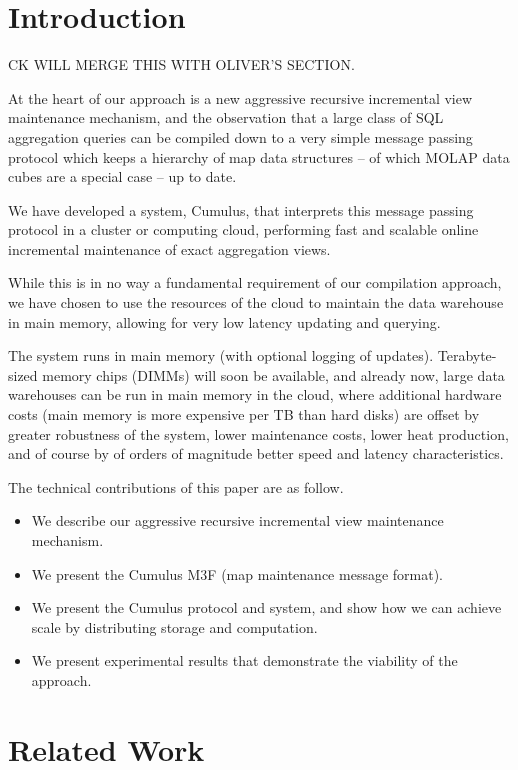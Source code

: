 
\section{Introduction}


CK WILL MERGE THIS WITH OLIVER'S SECTION.

At the heart of our approach is a new aggressive recursive incremental
view maintenance mechanism, and the observation that a large class of
SQL aggregation queries can be compiled down to a very simple message
passing protocol which keeps a hierarchy of map data structures -- of
which MOLAP data cubes are a special case -- up to date.

We have developed a system, Cumulus, that interprets this message passing
protocol in a cluster or computing cloud, performing fast and scalable
online incremental maintenance of exact aggregation views. 

While this is in no way a fundamental requirement of our compilation
approach, we have chosen to use the resources of the cloud to maintain
the data warehouse in main memory, allowing for very low latency
updating and querying.

The system runs in main memory (with optional logging of updates).
Terabyte-sized memory chips (DIMMs) will soon be available, and already now,
large data warehouses
can be run in main memory in the cloud, where additional hardware costs
(main memory is more expensive per TB than hard disks) are
offset by greater robustness of the system, lower maintenance
costs, lower heat production, and of course by of orders of magnitude
better speed and latency characteristics.


The technical contributions of this paper are as follow.
\begin{itemize}
\item
We describe our aggressive recursive incremental view maintenance mechanism.

\item
We present the Cumulus M3F (map maintenance message format).

\item
We present the Cumulus protocol and system, and show how we can achieve
scale by distributing storage and computation.

\item
We present experimental results that demonstrate the viability of the approach.
\end{itemize}


\section{Related Work}


